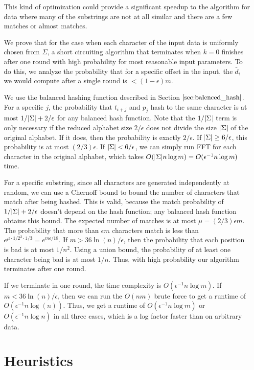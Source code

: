 \documentclass{article}
\theoremstyle{definition}
\newcommand{\eps}{\epsilon}
\DeclarePairedDelimiter{\abs}{\lvert}{\rvert}
\begin{document}
This kind of optimization could provide a significant speedup to the algorithm for data where many of the substrings are not at all similar and there are a few matches or almost matches.

We prove that for the case when each character of the input data is uniformly chosen from $\Sigma$, a short circuiting algorithm that terminates when $k = 0$ finishes after one round with high probability for most reasonable input parameters.
To do this, we analyze the probability that for a specific offset in the input, the $\tilde{d_i}$ we would compute after a single round is $< (1 - \eps)m$.

We use the balanced hashing function described in Section $\ref{sec:balenced_hash}$.
For a specific $j$, the probability that $t_{i+j}$ and $p_j$ hash to the same character is at most $1/\abs{\Sigma} + 2/\eps$ for any balanced hash function.
Note that the $1/\abs{\Sigma}$ term is only necessary if the reduced alphabet size $2/\eps$ does not divide the size $\abs{\Sigma}$ of the original alphabet.
If it does, then the probability is exactly $2/\eps$.
If $\abs{\Sigma} \ge 6/\eps$, this probability is at most $(2/3)\eps$.
If $\abs{\Sigma} < 6/\eps$, we can simply run FFT for each character in the original alphabet, which takes $O(\abs{\Sigma} n \log m) = O(\eps^{-1} n \log m)$ time.

For a specific substring, since all characters are generated independently at random, we can use a Chernoff bound to bound the number of characters that match after being hashed.
This is valid, because the match probability of $1/\abs{\Sigma} + 2/\eps$ doesn't depend on the hash function; any balanced hash function obtains this bound.
The expected number of matches is at most $\mu = (2/3)\eps m$.
The probability that more than $\eps m$ characters match is less than $e^{\mu \cdot 1/2^2 \cdot 1/3} = e^{m \eps/18}$.
If $m > 36 \ln(n)/\eps$, then the probability that each position is bad is at most $1/n^2$.
Using a union bound, the probability of at least one character being bad is at most $1/n$.
Thus, with high probability our algorithm terminates after one round.

If we terminate in one round, the time complexity is $O(\eps^{-1} n \log m)$.
If $m < 36 \ln(n)/\eps$, then we can run the $O(nm)$ brute force to get a runtime of $O(\eps^{-1} n \log(n))$.
Thus, we get a runtime of $O(\eps^{-1} n \log m)$ or $O(\eps^{-1} n \log n)$ in all three cases, which is a log factor faster than on arbitrary data.

\section{Heuristics}
\end{document}

